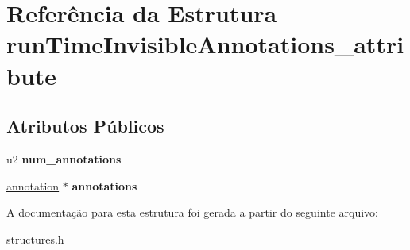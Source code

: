 \hypertarget{structrunTimeInvisibleAnnotations__attribute}{}\section{Referência da Estrutura run\+Time\+Invisible\+Annotations\+\_\+attribute}
\label{structrunTimeInvisibleAnnotations__attribute}
\subsection*{Atributos Públicos}
\begin{DoxyCompactItemize}
\item 
\mbox{\label{structrunTimeInvisibleAnnotations__attribute_a703d15c7112b673ff31b7e4b2d85782b}} 
u2 {\bfseries num\+\_\+annotations}
\item 
\mbox{\label{structrunTimeInvisibleAnnotations__attribute_a8f62eb72b381abe0fcc559ad874cf60b}} 
\hyperlink{structannotation}{annotation} $\ast$ {\bfseries annotations}
\end{DoxyCompactItemize}


A documentação para esta estrutura foi gerada a partir do seguinte arquivo\+:\begin{DoxyCompactItemize}
\item 
structures.\+h\end{DoxyCompactItemize}
